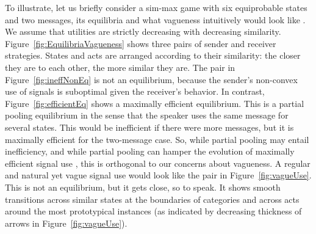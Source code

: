\documentclass[fleqn,reqno,10pt]{article}
\begin{document}
To illustrate, let us briefly consider a sim-max game with six equiprobable states and two
messages, its equilibria and what vagueness intuitively would look like \citep[see][for a more
thorough discussion]{Jager2007:The-Evolution-o,OConnor2013:The-Evolution-o}. We assume that
utilities are strictly decreasing with decreasing
similarity. Figure~\ref{fig:EquilibriaVagueness} shows three pairs of sender and receiver
strategies. States and acts are arranged according to their similarity: the closer they are to
each other, the more similar they are. The pair in Figure~\ref{fig:ineffNonEq} is not an
equilibrium, because the sender's non-convex use of signals is suboptimal given the receiver's
behavior. In contrast, Figure~\ref{fig:efficientEq} shows a maximally efficient
equilibrium. This is a partial pooling equilibrium in the sense that the speaker uses the same
message for several states. This would be inefficient if there were more messages, but it is
maximally efficient for the two-message case. So, while partial pooling may entail
inefficiency, and while partial pooling can hamper the evolution of maximally efficient signal
use
\citep[e.g.][]{Hutteger:2007_Evol_Indicatives_Imperatives,Pawlowitsch2008:Why-Evolution-d,HutteggerSkyrms2010:Evolutionary-Dy},
this is orthogonal to our concerns about vagueness. A regular and natural yet vague signal use
would look like the pair in Figure~\ref{fig:vagueUse}. This is not an equilibrium, but it gets close, so
to speak. It shows smooth transitions across similar states at the boundaries of categories and
across acts around the most prototypical instances (as indicated by decreasing thickness of
arrows in Figure~\ref{fig:vagueUse}).
\end{document}
